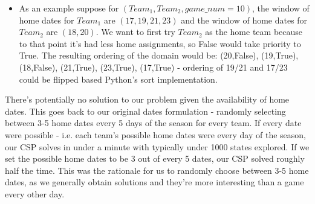 \documentclass{article}
\begin{document}
\begin{enumerate}
		\begin{itemize}
			\item As an example suppose for $(Team_1,Team_2,game\_num=10)$, the window of home dates for $Team_1$ are $(17,19,21,23)$ and the window of home dates for $Team_2$ are $(18,20)$. We want to first try $Team_2$ as the home team because to that point it's had less home assignments, so False would take priority to True. The resulting ordering of the domain would be: (20,False), (19,True), (18,False), (21,True), (23,True), (17,True) - ordering of 19/21 and 17/23 could be flipped based Python's sort implementation.
		\end{itemize}
	\end{enumerate}

	There's potentially no solution to our problem given the availability of home dates. This goes back to our original dates formulation - randomly selecting between 3-5 home dates every 5 days of the season for every team. If every date were possible - i.e. each team's possible home dates were every day of the season, our CSP solves in under a minute with typically under 1000 states explored. If we set the possible home dates to be 3 out of every 5 dates, our CSP solved roughly half the time. This was the rationale for us to randomly choose between 3-5 home dates, as we generally obtain solutions and they're more interesting than a game every other day.
\end{document}
